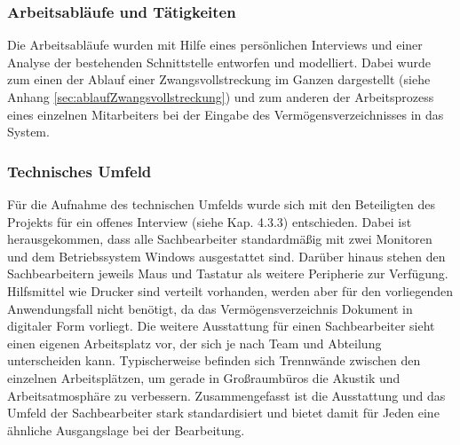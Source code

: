 \subsubsection{Arbeitsabläufe und Tätigkeiten}
Die Arbeitsabläufe wurden mit Hilfe eines persönlichen Interviews und einer Analyse der bestehenden Schnittstelle entworfen und modelliert. Dabei wurde zum einen der Ablauf einer  Zwangsvollstreckung im Ganzen dargestellt (siehe Anhang \ref{sec:ablaufZwangsvollstreckung}) und zum anderen der Arbeitsprozess eines einzelnen Mitarbeiters bei der Eingabe des Vermögensverzeichnisses in das System.


\subsubsection{Technisches Umfeld}
Für die Aufnahme des technischen Umfelds wurde sich mit den Beteiligten des Projekts für ein offenes Interview (siehe Kap. 4.3.3) entschieden. Dabei ist herausgekommen, dass alle Sachbearbeiter standardmäßig mit zwei Monitoren und dem Betriebssystem Windows ausgestattet sind. Darüber hinaus stehen den Sachbearbeitern jeweils Maus und Tastatur als weitere Peripherie zur Verfügung. Hilfsmittel wie Drucker sind verteilt vorhanden, werden aber für den vorliegenden Anwendungsfall nicht benötigt, da das Vermögensverzeichnis Dokument in digitaler Form vorliegt. Die weitere Ausstattung für einen Sachbearbeiter sieht einen eigenen Arbeitsplatz vor, der sich je nach Team und Abteilung unterscheiden kann. Typischerweise befinden sich Trennwände zwischen den einzelnen Arbeitsplätzen, um gerade in Großraumbüros die Akustik und Arbeitsatmosphäre zu verbessern. Zusammengefasst ist die Ausstattung und das Umfeld der Sachbearbeiter stark standardisiert und bietet damit für Jeden eine ähnliche Ausgangslage bei der Bearbeitung.


